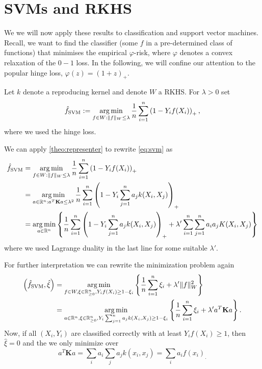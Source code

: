 \section{SVMs and RKHS}

We we will now apply these results to classification and support vector machines. Recall, we want to find the classifier (some $f$ in a pre-determined class of functions) that minimises the empirical $\varphi$-risk, where $\varphi$ denotes a convex relaxation of the $0-1$ loss. In the following, we will confine our attention to the popular hinge loss, $\varphi(z) = (1 + z)_+$.

\begin{definition}
Let $k$ denote a reproducing kernel and denote $W$ a RKHS. For $\lambda > 0$ set 
\begin{equation}\label{eq:svm}
	\hat{f}_\mathrm{SVM} := \operatorname*{arg\,min}_{f \in W: \|f\|_W \leq \lambda} \frac{1}{n}\sum_{i = 1}^n \left(1 - Y_i f(X_i)\right)_+,
\end{equation}
where we used the hinge loss. 
\end{definition}

We can apply \autoref{theo:representer} to rewrite \eqref{eq:svm} as 
\begin{align*}
	\hat{f}_\mathrm{SVM} &= \operatorname*{arg\,min}_{f \in W: \|f\|_W \leq \lambda} \frac{1}{n}\sum_{i = 1}^n \left(1 - Y_i f(X_i)\right)_+ \\
											 &= \operatorname*{arg\,min}_{a \in \mathbb{R}^n: a^T\mathbf{K}a \leq \lambda^2} \frac{1}{n}\sum_{i = 1}^n \left(1 - Y_i \sum_{j=1}^n a_j k(X_i, X_j)\right)_+ \\
											 &= \operatorname*{arg\,min}_{a \in \mathbb{R}^n} \left\{\frac{1}{n}\sum_{i = 1}^n \left(1 - Y_i \sum_{j=1}^n a_j k(X_i, X_j)\right)_+ + \lambda' \sum_{i=1}^n\sum_{j=1}^n a_ia_j K(X_i, X_j) \right\} 
\end{align*}
where we used Lagrange duality in the last line for some suitable $\lambda'$.

For further interpretation we can rewrite the minimization problem again 
\begin{align*}
	\left(\hat{f}_\mathrm{SVM}, \hat{\xi} \right) &= \operatorname*{arg\,min}_{f \in W, \xi \in \mathbb{R}_{\geq 0}^n, Y_if(X_i) \geq 1 - \xi_i} \left\{\frac{1}{n}\sum_{i=1}^n \xi_i + \lambda'\|f\|_W^2\right\} \\
	&=\operatorname*{arg\,min}_{a\in\mathbb{R}^n, \xi \in \mathbb{R}_{\geq 0}^n, Y_i\sum_{j=1}^n a_j k(X_i, X_j) \geq 1 - \xi_i} \left\{\frac{1}{n}\sum_{i=1}^n \xi_i + \lambda'a^T\mathbf{K}a\right\}.
\end{align*}
Now, if all $(X_i, Y_i)$ are classified correctly with at least $Y_if(X_i) \geq 1$, then $\hat{\xi} = 0$ and the we only minimize over $$a^T\mathbf{K}a = \sum_ia_i \sum_j a_j k(x_i, x_j)=\sum_i a_i f(x_i)_.$$


